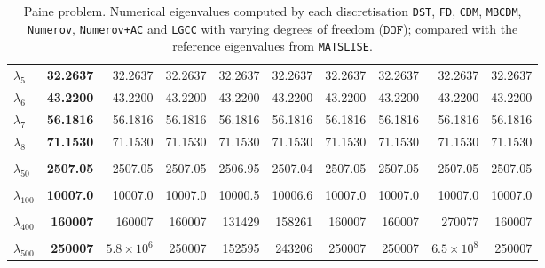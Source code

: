 \begin{table}[htbp]
{{{\begin{tabular}{lrrrrrrrrr}
      $\lambda_{5}$ & \textbf{32.2637} & 32.2637 & 32.2637 & 32.2637 & 32.2637 & 32.2637 & 32.2637 & 32.2637 & 32.2637 \\
      $\lambda_{6}$ & \textbf{43.2200} & 43.2200 & 43.2200 & 43.2200 & 43.2200 & 43.2200 & 43.2200 & 43.2200 & 43.2200 \\
      $\lambda_{7}$ & \textbf{56.1816} & 56.1816 & 56.1816 & 56.1816 & 56.1816 & 56.1816 & 56.1816 & 56.1816 & 56.1816 \\
      $\lambda_{8}$ & \textbf{71.1530} & 71.1530 & 71.1530 & 71.1530 & 71.1530 & 71.1530 & 71.1530 & 71.1530 & 71.1530 \\
      & & & & & & & & & \\
      $\lambda_{50}$ & \textbf{2507.05} & 2507.05 & 2507.05 & 2506.95 & 2507.04 & 2507.05 & 2507.05 & 2507.05 & 2507.05 \\
      & & & & & & & & & \\
      $\lambda_{100}$ & \textbf{10007.0} & 10007.0 & 10007.0 & 10000.5 & 10006.6 & 10007.0 & 10007.0 & 10007.0 & 10007.0 \\
      & & & & & & & & & \\
      $\lambda_{400}$ & \textbf{160007} & 160007 & 160007 & 131429 & 158261 & 160007 & 160007 & 270077 & 160007 \\
      & & & & & & & & & \\
      $\lambda_{500}$ & \textbf{250007} & $5.8 \times 10^{6}$ & 250007 & 152595 & 243206 & 250007 & 250007 & $6.5 \times 10^{8}$ & 250007 \\
      \bottomrule
    \end{tabular}}}
  }
  \caption{Paine problem. Numerical eigenvalues computed by each discretisation \texttt{DST}, \texttt{FD}, \texttt{CDM}, \texttt{MBCDM}, \texttt{Numerov}, \texttt{Numerov+AC} and \texttt{LGCC} with varying degrees of freedom ($\mathtt{DOF}$); compared with the reference eigenvalues from \texttt{MATSLISE}.}
  \label{tab:eigenvalues_head_paine_transposed}
\end{table}
